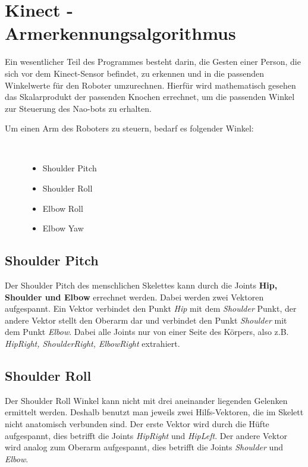\section{Kinect - Armerkennungsalgorithmus}\label{algo_angle}
Ein wesentlicher Teil des Programmes besteht darin, die Gesten einer Person, die sich vor dem Kinect-Sensor befindet, zu erkennen und in die passenden Winkelwerte für den Roboter umzurechnen.
Hierfür wird mathematisch gesehen das Skalarprodukt der passenden Knochen errechnet, um die passenden Winkel zur Steuerung des Nao-bots zu erhalten.

\begin{description}
	\item[Um einen Arm des Roboters zu steuern, bedarf es folgender Winkel:]~\par
	\begin{itemize}
		\item Shoulder Pitch
		\item Shoulder Roll
		\item Elbow Roll
		\item Elbow Yaw
	\end{itemize}
\end{description}

\subsection{Shoulder Pitch}
Der Shoulder Pitch des menschlichen Skelettes kann durch die Joints \textbf{Hip, Shoulder und Elbow} errechnet werden. Dabei werden zwei Vektoren aufgespannt. Ein Vektor verbindet den Punkt \textit{Hip} mit dem \textit{Shoulder} Punkt, der andere Vektor stellt den Oberarm dar und verbindet den Punkt \textit{Shoulder} mit dem Punkt \textit{Elbow}. Dabei alle Joints nur von einer Seite des Körpers, also z.B. \textit{HipRight, ShoulderRight, ElbowRight} extrahiert.


\subsection{Shoulder Roll}
Der Shoulder Roll Winkel kann nicht mit drei aneinander liegenden Gelenken ermittelt werden. Deshalb benutzt man jeweils zwei Hilfs-Vektoren, die im Skelett nicht anatomisch verbunden sind. Der erste Vektor wird durch die Hüfte aufgespannt, dies betrifft die Joints \textit{HipRight} und \textit{HipLeft}. Der andere Vektor wird analog zum Oberarm aufgespannt, dies betrifft die Joints \textit{Shoulder} und \textit{Elbow}.

